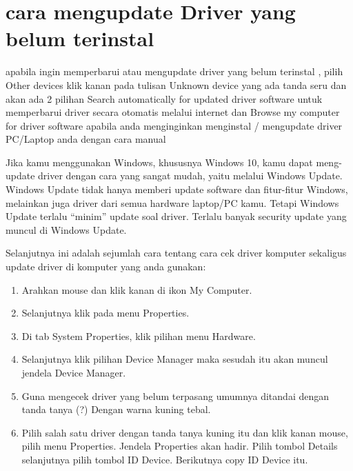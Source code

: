 \section{cara mengupdate Driver yang belum terinstal}

apabila ingin memperbarui atau mengupdate driver yang belum terinstal , pilih Other devices klik kanan pada tulisan Unknown device yang ada tanda seru dan akan ada 2 pilihan Search automatically for updated driver software untuk memperbarui driver secara otomatis melalui internet dan Browse my computer for driver software apabila anda menginginkan menginstal / mengupdate driver PC/Laptop anda dengan cara manual

Jika kamu menggunakan Windows, khususnya Windows 10, kamu dapat meng-update driver dengan cara yang sangat mudah, yaitu melalui Windows Update.
Windows Update tidak hanya memberi update software dan fitur-fitur Windows, melainkan juga driver dari semua hardware laptop/PC kamu. Tetapi Windows Update terlalu “minim” update soal driver. Terlalu banyak security update yang muncul di Windows Update.

Selanjutnya ini adalah sejumlah cara tentang cara cek driver komputer sekaligus update driver di komputer yang anda gunakan: 
\begin{enumerate}
\item Arahkan mouse dan klik kanan di ikon My Computer.
\item Selanjutnya klik pada menu Properties.
\item Di tab System Properties, klik pilihan menu Hardware.
\item Selanjutnya klik pilihan Device Manager maka sesudah itu akan muncul jendela Device Manager.
\item Guna mengecek driver yang belum terpasang umumnya ditandai dengan tanda tanya (?) Dengan warna kuning tebal.
\item Pilih salah satu driver dengan tanda tanya kuning itu dan klik kanan mouse, pilih menu Properties. Jendela Properties akan hadir. Pilih tombol Details selanjutnya pilih tombol ID Device. Berikutnya copy ID Device itu.
\end{enumerate}
